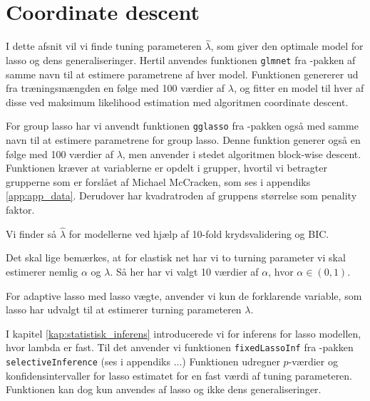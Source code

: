\section{Coordinate descent}
I dette afsnit vil vi finde tuning parameteren $\widehat\lambda$, som giver den optimale model for lasso og dens generaliseringer. 
Hertil anvendes funktionen \texttt{glmnet} fra \Rlang-pakken af samme navn til at estimere parametrene af hver model. 
Funktionen genererer ud fra træningsmængden en følge med 100 værdier af $\lambda$, og fitter en model til hver af disse ved maksimum likelihood estimation med algoritmen coordinate descent. 

For group lasso har vi anvendt funktionen \texttt{gglasso} fra \Rlang-pakken også med samme navn til at estimere parametrene for group lasso. 
Denne funktion generer også en følge med 100 værdier af $\lambda$, men anvender i stedet algoritmen block-wise descent. 
Funktionen kræver at variablerne er opdelt i grupper, hvortil vi betragter grupperne som er forslået af Michael McCracken, som ses i appendiks \ref{app:app_data}. 
Derudover har kvadratroden af gruppens størrelse som penality faktor.

Vi finder så $\widehat\lambda$ for modellerne ved hjælp af 10-fold krydsvalidering og BIC. 

Det skal lige bemærkes, at for elastisk net har vi to turning parameter vi skal estimerer nemlig $\alpha$ og $\lambda$.  Så her har vi valgt 10 værdier af $\alpha$, hvor $\alpha \in (0,1)$. 

For adaptive lasso med lasso vægte, anvender vi kun de forklarende variable, som lasso har udvalgt til at estimerer turning parameteren $\lambda$. 

I kapitel \ref{kap:statistisk_inferens} introducerede vi for inferens for lasso modellen, hvor lambda er fast.
Til det anvender vi funktionen  \texttt{fixedLassoInf} fra \Rlang-pakken \texttt{selectiveInference} (ses i appendiks ...) 
Funktionen udregner \(p\)-værdier og konfidensintervaller for lasso estimatet for en fast værdi af tuning parameteren.
Funktionen kan dog kun anvendes af lasso og ikke dens generaliseringer. 






